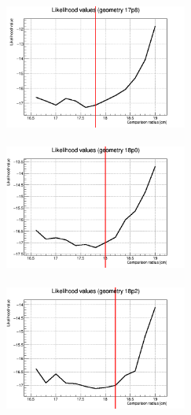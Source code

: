 \documentclass[a4paper, 11pt]{report}
\begin{document}
\begin{figure}[htbp]
\begin{minipage}[b]{.32\textwidth}
\includegraphics[width=6cm, height=4.6cm]{figs/likelihood100LowStat/likelihood17p8.png}
\end{minipage}\hfill
\begin{minipage}[b]{.32\textwidth}
\includegraphics[width=6cm, height=4.6cm]{figs/likelihood100LowStat/likelihood18p0.png}
\end{minipage} \hfill
\begin{minipage}[b]{.32\textwidth}
\includegraphics[width=6cm, height=4.6cm]{figs/likelihood100LowStat/likelihood18p2.png}
\end{minipage} \hfill \vspace{10pt}


\end{figure}
\end{document}
